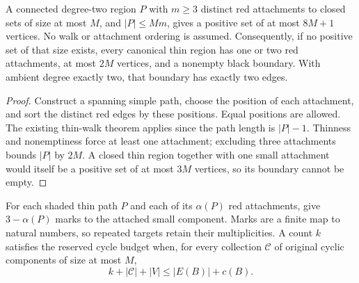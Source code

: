 \begin{theorem}
  \label{thm:lowerbounds-algebraic-thin-region-witness}
  \leanok
  A connected degree-two region $P$ with $m\ge3$ distinct red attachments
  to closed sets of size at most $M$, and $|P|\le Mm$, gives a positive
  set of at most $8M+1$ vertices. No walk or attachment ordering is assumed.
  Consequently, if no positive set of that size exists, every canonical
  thin region has one or two red attachments, at most $2M$ vertices, and
  a nonempty black boundary.
  With ambient degree exactly two, that boundary has exactly two edges.
\end{theorem}
\begin{proof}
  \leanok
  Construct a spanning simple path, choose the position of each attachment,
  and sort the distinct red edges by these positions. Equal positions are
  allowed. The existing thin-walk theorem applies since the path length
  is $|P|-1$. Thinness and nonemptiness force at least one attachment;
  excluding three attachments bounds $|P|$ by $2M$. A closed thin region
  together with one small attachment would itself be a positive set of
  at most $3M$ vertices, so its boundary cannot be empty.
\end{proof}

\begin{definition}
  \label{def:lowerbounds-algebraic-thin-path-marks}
  \leanok
  For each shaded thin path $P$ and each of its $\alpha(P)$ red
  attachments, give $3-\alpha(P)$ marks to the attached small component.
  Marks are a finite map to natural numbers, so repeated targets retain
  their multiplicities. A count $k$ satisfies the reserved cycle budget
  when, for every collection $\mathcal C$ of original cyclic components
  of size at most $M$,
  \[
    k+|\mathcal C|+|V|\le |E(B)|+c(B).
  \]
\end{definition}

